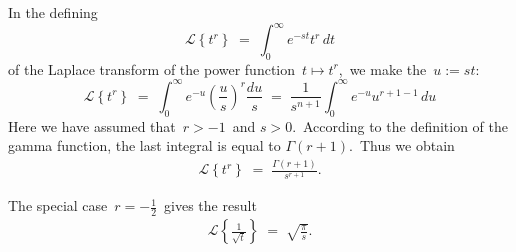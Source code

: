 \documentclass[12pt]{article}
\theoremstyle{definition}
\begin{document}
In the defining 
$$\mathcal{L}\left\{t^r\right\} \;=\; \int_0^\infty\!e^{-st}t^r\,dt$$
of the Laplace transform of the power function \,$t \mapsto t^r$,\, we make the  \,$u := st$:
$$\mathcal{L}\left\{t^r\right\} \;=\; \int_0^\infty\!e^{-u}\left(\frac{u}{s}\right)^r\frac{du}{s} 
\;=\; \frac{1}{s^{n+1}}\!\int_0^\infty\!e^{-u}u^{r+1-1}\,du$$
Here we have assumed that\, $r > -1$\, and $s > 0$.\, According to the definition of the gamma function, the last integral is equal to 
$\Gamma(r\!+\!1)$.\, Thus we obtain
\begin{align}
\mathcal{L}\left\{t^r\right\} \;=\; \frac{\Gamma(r\!+\!1)}{s^{r+1}}.
\end{align}


The special case\, $r = -\frac{1}{2}$\, gives the result
\begin{align}
\mathcal{L}\left\{\frac{1}{\sqrt{t}}\right\} \;=\; \sqrt{\frac{\pi}{s}}.
\end{align}
\end{document}

